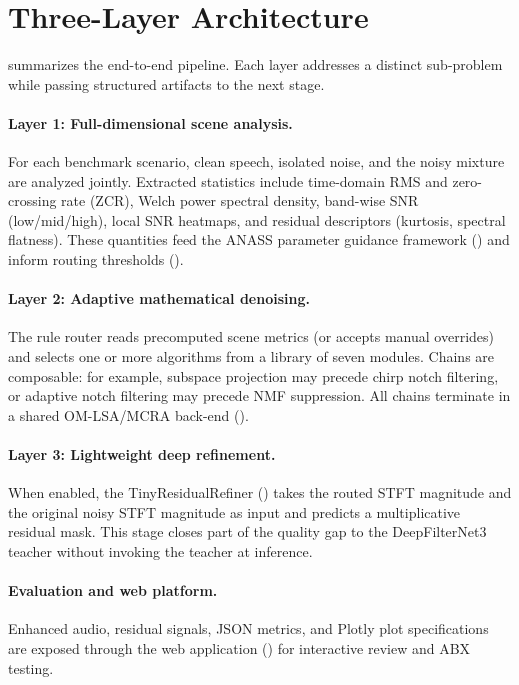 \section{Three-Layer Architecture}
\label{sec:architecture}

 summarizes the end-to-end pipeline. Each layer addresses a distinct sub-problem while passing structured artifacts to the next stage.


\paragraph{Layer 1: Full-dimensional scene analysis.}
For each benchmark scenario, clean speech, isolated noise, and the noisy mixture are analyzed jointly. Extracted statistics include time-domain RMS and zero-crossing rate (ZCR), Welch power spectral density, band-wise SNR (low/mid/high), local SNR heatmaps, and residual descriptors (kurtosis, spectral flatness). These quantities feed the ANASS parameter guidance framework () and inform routing thresholds ().

\paragraph{Layer 2: Adaptive mathematical denoising.}
The rule router reads precomputed scene metrics (or accepts manual overrides) and selects one or more algorithms from a library of seven modules. Chains are composable: for example, subspace projection may precede chirp notch filtering, or adaptive notch filtering may precede NMF suppression. All chains terminate in a shared OM-LSA/MCRA back-end ().

\paragraph{Layer 3: Lightweight deep refinement.}
When enabled, the TinyResidualRefiner () takes the routed STFT magnitude and the original noisy STFT magnitude as input and predicts a multiplicative residual mask. This stage closes part of the quality gap to the DeepFilterNet3 teacher without invoking the teacher at inference.

\paragraph{Evaluation and web platform.}
Enhanced audio, residual signals, JSON metrics, and Plotly plot specifications are exposed through the web application () for interactive review and ABX testing.

